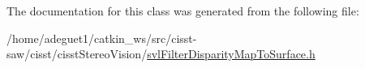 The documentation for this class was generated from the following file\-:\begin{DoxyCompactItemize}
\item 
/home/adeguet1/catkin\-\_\-ws/src/cisst-\/saw/cisst/cisst\-Stereo\-Vision/\hyperlink{svl_filter_disparity_map_to_surface_8h}{svl\-Filter\-Disparity\-Map\-To\-Surface.\-h}\end{DoxyCompactItemize}
